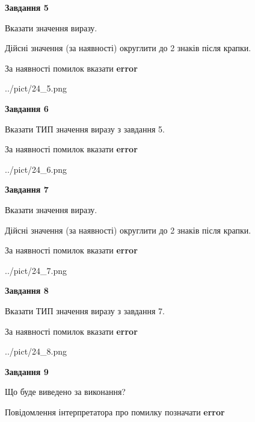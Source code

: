 \documentclass[11pt, ukrainian]{article}
\begin{document}
{\begin {large}
{\begin {center}\textbf{Завдання 5}\end {center}}\par
Вказати значення виразу. \par
Дійсні значення (за наявності) округлити до 2 знаків після крапки. \par
За наявності помилок вказати \textbf{error}

\begin{center}
	{../pict/24_5.png}
\end{center}
\newpage

{\begin {center}\textbf{Завдання 6}\end {center}}\par
Вказати ТИП значення виразу з завдання 5. \par
За наявності помилок вказати \textbf{error}

\begin{center}
	{../pict/24_6.png}
\end{center}
\newpage

{\begin {center}\textbf{Завдання 7}\end {center}}\par
Вказати значення виразу. \par
Дійсні значення (за наявності) округлити до 2 знаків після крапки. \par
За наявності помилок вказати \textbf{error}

\begin{center}
	{../pict/24_7.png}
\end{center}
\newpage

{\begin {center}\textbf{Завдання 8}\end {center}}\par
Вказати ТИП значення виразу з завдання 7. \par
За наявності помилок вказати \textbf{error}

\begin{center}
	{../pict/24_8.png}
\end{center}
\newpage

{\begin {center}\textbf{Завдання 9}\end {center}}\par
Що буде виведено за виконання? \par
Повідомлення інтерпретатора про помилку позначати \textbf{error}


\end{large}}
\end{document}
